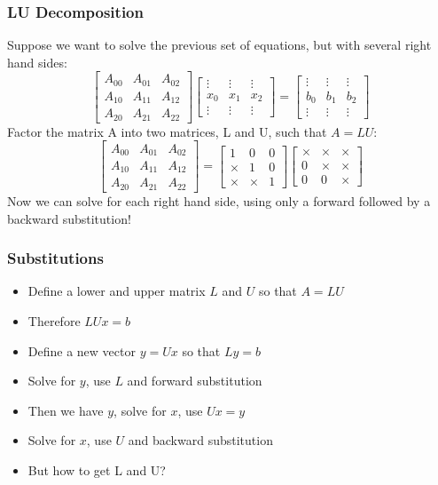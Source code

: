 \begin{frame}[fragile]
  \frametitle{LU Decomposition}
  Suppose we want to solve the previous set of equations, but with several right hand sides:
    \[ 
    \begin{bmatrix}
A_{00} & A_{01} & A_{02}\\ 
A_{10} & A_{11} & A_{12}\\ 
A_{20} & A_{21} & A_{22}
\end{bmatrix}
\begin{bmatrix}
\vdots & \vdots & \vdots \\
x_0 & x_1 & x_2 \\
\vdots & \vdots & \vdots
\end{bmatrix} = 
\begin{bmatrix}
\vdots & \vdots & \vdots \\
b_0 & b_1 & b_2 \\
\vdots & \vdots & \vdots
\end{bmatrix}
\]\pause
Factor the matrix A into two matrices, L and U, such that $A=LU$:
\[ 
    \begin{bmatrix}
A_{00} & A_{01} & A_{02}\\ 
A_{10} & A_{11} & A_{12}\\ 
A_{20} & A_{21} & A_{22}
\end{bmatrix} = 
\begin{bmatrix}
1 & 0 & 0 \\
\times & 1 & 0 \\
\times & \times & 1
\end{bmatrix}
\begin{bmatrix}
\times & \times & \times \\
0 & \times & \times \\
0 & 0 & \times
\end{bmatrix}
\]
Now we can solve for each right hand side, using only a forward
followed by a backward substitution!
\end{frame}

\begin{frame}[fragile]
  \frametitle{Substitutions}
  \begin{itemize}
    \item Define a lower and upper matrix $L$ and $U$ so that $A = LU$
    \item Therefore $LUx = b$
    \item Define a new vector $y = Ux$ so that $Ly = b$
    \item Solve for $y$, use $L$ and forward substitution
    \item Then we have $y$, solve for $x$, use $Ux = y$
    \item Solve for $x$, use $U$ and backward substitution
    \item But how to get L and U?
  \end{itemize}
\end{frame}


